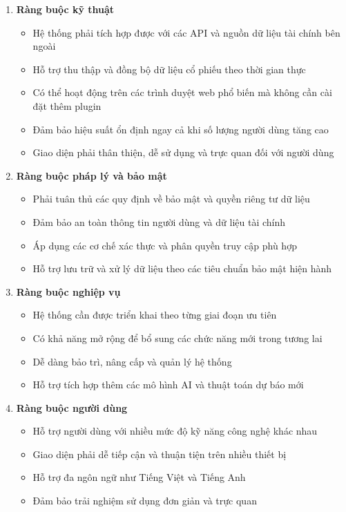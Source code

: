 \documentclass[12pt, a4paper]{article}
\begin{document}
\begin{enumerate}
    \renewcommand{\labelenumi}{\arabic{enumi})}

    \item \textbf{Ràng buộc kỹ thuật}
          \begin{itemize}
              \item Hệ thống phải tích hợp được với các API và nguồn dữ liệu tài chính bên ngoài
              \item Hỗ trợ thu thập và đồng bộ dữ liệu cổ phiếu theo thời gian thực
              \item Có thể hoạt động trên các trình duyệt web phổ biến mà không cần cài đặt thêm plugin
              \item Đảm bảo hiệu suất ổn định ngay cả khi số lượng người dùng tăng cao
              \item Giao diện phải thân thiện, dễ sử dụng và trực quan đối với người dùng
          \end{itemize}

    \item \textbf{Ràng buộc pháp lý và bảo mật}
          \begin{itemize}
              \item Phải tuân thủ các quy định về bảo mật và quyền riêng tư dữ liệu
              \item Đảm bảo an toàn thông tin người dùng và dữ liệu tài chính
              \item Áp dụng các cơ chế xác thực và phân quyền truy cập phù hợp
              \item Hỗ trợ lưu trữ và xử lý dữ liệu theo các tiêu chuẩn bảo mật hiện hành
          \end{itemize}

    \item \textbf{Ràng buộc nghiệp vụ}
          \begin{itemize}
              \item Hệ thống cần được triển khai theo từng giai đoạn ưu tiên
              \item Có khả năng mở rộng để bổ sung các chức năng mới trong tương lai
              \item Dễ dàng bảo trì, nâng cấp và quản lý hệ thống
              \item Hỗ trợ tích hợp thêm các mô hình AI và thuật toán dự báo mới
          \end{itemize}

    \item \textbf{Ràng buộc người dùng}
          \begin{itemize}
              \item Hỗ trợ người dùng với nhiều mức độ kỹ năng công nghệ khác nhau
              \item Giao diện phải dễ tiếp cận và thuận tiện trên nhiều thiết bị
              \item Hỗ trợ đa ngôn ngữ như Tiếng Việt và Tiếng Anh
              \item Đảm bảo trải nghiệm sử dụng đơn giản và trực quan
          \end{itemize}

\end{enumerate}
\end{document}
